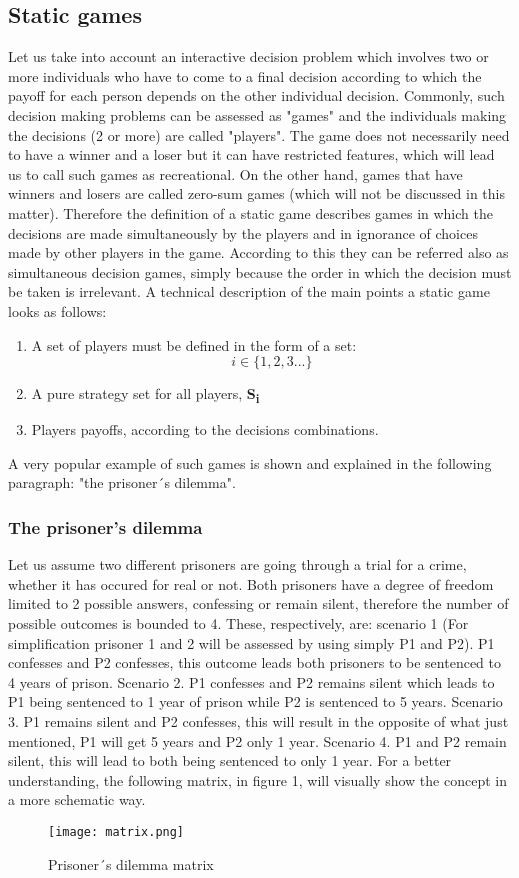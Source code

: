 \documentclass[conference]{IEEEtran}
\begin{document}
\subsection{Static games}
Let us take into account an interactive decision problem which involves two or more individuals who have to come to a final decision according to which the payoff for each person depends on the other individual decision. Commonly, such decision making problems can be assessed as "games" and the individuals making the decisions (2 or more) are called "players". The game does not necessarily need to have a winner and a loser but it can have restricted features, which will lead us to call such games as recreational. On the other hand, games
that have winners and losers are called zero-sum games (which will not be discussed in this matter). 
Therefore the definition of a static game describes games in which the decisions are made simultaneously by the players and in ignorance of choices made by other players in the game. According to this they can be referred also as simultaneous decision games, simply because the order in which the decision must be taken is irrelevant\cite{b3}. A technical description of the main points a static game looks as follows:
\begin{enumerate}
  \item A set of players must be defined in the form of a set: \[i\in       \{1,2,3...\}\]
  \item A pure strategy set for all players, \textbf{S{\textsubscript{i}}}
  \item Players payoffs, according to the decisions combinations.
\end{enumerate} 
A very popular example of such games is shown and explained in the following paragraph: "the prisoner´s dilemma"\cite{b4}.
\subsubsection{The prisoner's dilemma}
Let us assume two different prisoners are going through a trial for a crime, whether it has occured for real or not. Both prisoners have a degree of freedom limited to 2 possible answers, confessing or remain silent, therefore the number of possible outcomes is bounded to 4. These, respectively, are: scenario 1 (For simplification prisoner 1 and 2 will be assessed by using simply P1 and P2). P1 confesses and P2 confesses, this outcome leads both prisoners to be sentenced to 4 years of prison. Scenario 2. P1 confesses and P2 remains silent which leads to P1 being sentenced to 1 year of prison while P2 is sentenced to 5 years. Scenario 3. P1 remains silent and P2 confesses, this will result in the opposite of what just mentioned, P1 will get 5 years and P2 only 1 year. Scenario 4. P1 and P2 remain silent, this will lead to both being sentenced to only 1 year. For a better understanding, the following matrix, in figure 1, will visually show the concept in a more schematic way.
\begin{figure}[h]
    \centerline{\texttt{[image: matrix.png]}}
    \caption{Prisoner´s dilemma matrix}
    \label{pdmatrix}
\end{figure}
\end{document}
